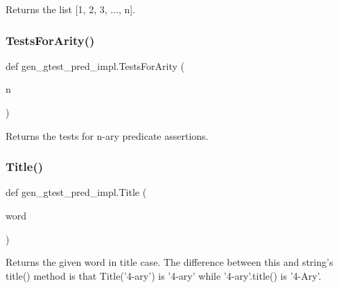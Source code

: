 \begin{DoxyVerb}Returns the list [1, 2, 3, ..., n].\end{DoxyVerb}
 \mbox{\label{namespacegen__gtest__pred__impl_ab0da913fa15e5695d5bb2dd1de5dec57}} 
\subsubsection{\texorpdfstring{TestsForArity()}{TestsForArity()}}
{\footnotesize\ttfamily def gen\+\_\+gtest\+\_\+pred\+\_\+impl.\+Tests\+For\+Arity (\begin{DoxyParamCaption}\item[{}]{n }\end{DoxyParamCaption})}

\begin{DoxyVerb}Returns the tests for n-ary predicate assertions.\end{DoxyVerb}
 \mbox{\label{namespacegen__gtest__pred__impl_ae49dd9bd9152dbcb3ca7994ce04c37ba}} 
\subsubsection{\texorpdfstring{Title()}{Title()}}
{\footnotesize\ttfamily def gen\+\_\+gtest\+\_\+pred\+\_\+impl.\+Title (\begin{DoxyParamCaption}\item[{}]{word }\end{DoxyParamCaption})}

\begin{DoxyVerb}Returns the given word in title case.  The difference between
this and string's title() method is that Title('4-ary') is '4-ary'
while '4-ary'.title() is '4-Ary'.\end{DoxyVerb}
 \mbox{\label{namespacegen__gtest__pred__impl_a57b922f50d0807896496dcd883c1f098}} 
